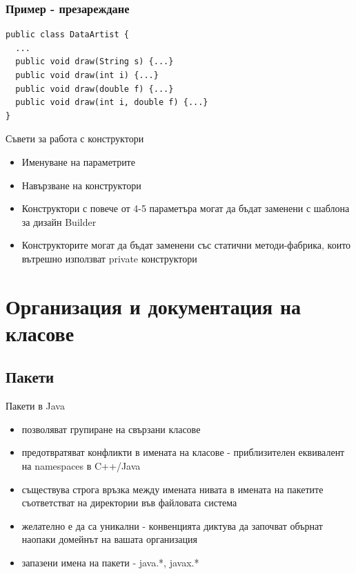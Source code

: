 \documentclass{beamer}
\begin{document}
\begin{frame}[fragile]
  \frametitle{Пример - презареждане}
  \transdissolve
\begin{lstlisting}
public class DataArtist {
  ...
  public void draw(String s) {...}
  public void draw(int i) {...}
  public void draw(double f) {...}
  public void draw(int i, double f) {...}
}
\end{lstlisting}
\end{frame}


\begin{frame}{Съвети за работа с конструктори}
  \transdissolve
  \begin{itemize}
  \item Именуване на параметрите \pause
  \item Навързване на конструктори \pause
  \item Конструктори с повече от 4-5 параметъра могат да бъдат
    заменени с шаблона за дизайн Builder \pause
  \item Конструкторите могат да бъдат заменени със статични
    методи-фабрика, които вътрешно използват private конструктори
  \end{itemize}
\end{frame}

\section{Организация и документация на класове}
\subsection{Пакети}
\begin{frame}{Пакети в Java}
  \transdissolve
  \begin{itemize}
  \item позволяват групиране на свързани класове \pause
  \item предотвратяват конфликти в имената на класове - приблизителен
    еквивалент на namespaces в C++/Java \pause
  \item съществува строга връзка между имената нивата в имената на
    пакетите съответстват на директории във файловата система \pause
  \item желателно е да са уникални - конвенцията диктува да започват
    обърнат наопаки домейнът на вашата организация \pause
  \item запазени имена на пакети - java.*, javax.*
  \end{itemize}
\end{frame}
\end{document}
